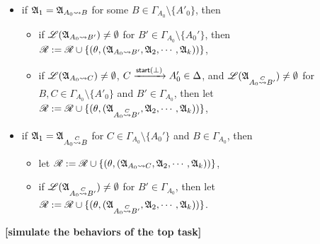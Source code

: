 {\begin{minipage}{\textwidth}
{\begin{enumerate}
\begin{itemize}
      \item if  ${\mathfrak{A} }_1 = {\mathfrak{A} }_{A_0\rightsquigarrow B}$ for some $B \in \Gamma_{A_0} \setminus \{A'_0\}$, then
      \begin{itemize}
      \item if ${\mathscr{L} }({\mathfrak{A} }_{A_0\rightsquigarrow B'}) \neq \emptyset$ for $B' \in \Gamma_{A_0}\setminus\{A_0'\}$, then $\mathscr{R} := \mathscr{R} \cup \{(\theta, ({\mathfrak{A} }_{A_0 \rightsquigarrow B'}, {\mathfrak{A} }_2,\cdots,{\mathfrak{A} }_k))\}$,
      \item if ${\mathscr{L} }({\mathfrak{A} }_{A_0 \rightsquigarrow C}) \neq \emptyset$, $C \xrightarrow[]{{\mathsf{start} }(\bot)} A_0' \in \Delta$, and ${\mathscr{L} }({\mathfrak{A} }_{A_0 \stackrel{C}{\rightsquigarrow} B'}) \neq \emptyset$ for $B, C \in \Gamma_{A_0} \setminus \{A'_0\}$ and $B' \in \Gamma_{A_0}$, then let $\mathscr{R} := \mathscr{R} \cup \{(\theta, ({\mathfrak{A} }_{A_0\stackrel{C}\rightsquigarrow B'}, {\mathfrak{A} }_2,\cdots,{\mathfrak{A} }_k))\}$,
      \end{itemize}
        \item if ${\mathfrak{A} }_1 = {\mathfrak{A} }_{A_0\stackrel{C}\rightsquigarrow B}$ for $C \in\Gamma_{A_0}\setminus\{A_0'\}$ and $B \in \Gamma_{A_0}$, then 
        \begin{itemize}
        \item let $\mathscr{R} := \mathscr{R} \cup \{(\theta, ({\mathfrak{A} }_{A_0\rightsquigarrow C}, {\mathfrak{A} }_2,\cdots,{\mathfrak{A} }_k))\}$, 
       \item if ${\mathscr{L} }({\mathfrak{A} }_{A_0 \stackrel{C}{\rightsquigarrow} B'}) \neq \emptyset$ for $B' \in \Gamma_{A_0}$, then let $\mathscr{R} := \mathscr{R} \cup \{(\theta, ({\mathfrak{A} }_{A_0\stackrel{C}{\rightsquigarrow} B'}, {\mathfrak{A} }_2,\cdots,{\mathfrak{A} }_k))\}$.
       \end{itemize}
    \end{itemize}
        \textbf{[simulate the behaviors of the top task]}
\end{enumerate}
}
\end{minipage}
}


